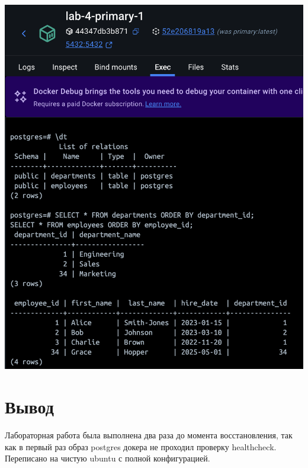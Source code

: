 \documentclass{article}
\begin{document}
\begin{center}
    \includegraphics[width=.9\textwidth]{new-replica.png}
\end{center}

\section*{Вывод}
Лабораторная работа была выполнена два раза до момента восстановления, так как в первый раз образ postgres докера не проходил проверку healthcheck. Переписано на чистую ubuntu с полной конфигурацией.
\end{document}
